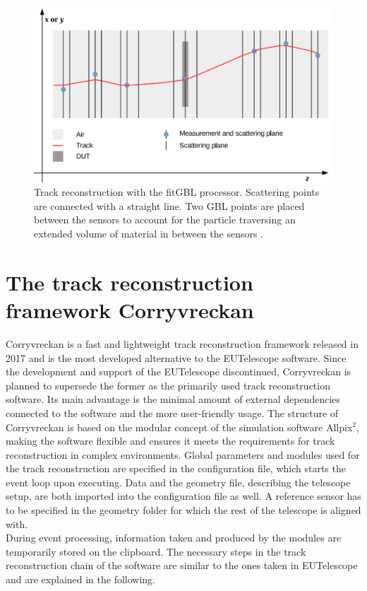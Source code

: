 \begin{figure}
  \centering
  \includegraphics[height=0.5\textwidth]{images/gbl.png}
  \caption{Track reconstruction with the fitGBL processor. Scattering points are connected with a straight line. Two GBL points are placed between the sensors
  to account for the particle traversing an extended volume of material in between the sensors \cite{gbl}. }
  \label{fig:gbl}
\end{figure}



\section{The track reconstruction framework Corryvreckan}
Corryvreckan is a fast and lightweight track reconstruction framework released in 2017 and is the most developed alternative to the EUTelescope software.
Since the development and support of the EUTelescope discontinued, Corryvreckan is planned to supersede the former as the primarily used track
reconstruction software. Its main advantage is the minimal amount of external dependencies connected to the software and the more user-friendly usage.
The structure of Corryvreckan is based on the modular concept of the simulation software Allpix$^2$,
making the software flexible and ensures it meets the requirements for track reconstruction in
complex environments. Global parameters and modules used for the track reconstruction are specified in the configuration file, which starts the event loop upon
executing. Data and the geometry file, describing the telescope setup, are both imported into the configuration file as well.
A reference sensor has to be specified in the geometry folder
for which the rest of the telescope is aligned with. \\
During event processing, information taken and produced by the modules are temporarily stored on the clipboard.
The necessary steps in the track reconstruction chain of the software are similar to the ones taken in EUTelescope and are explained in the following.

